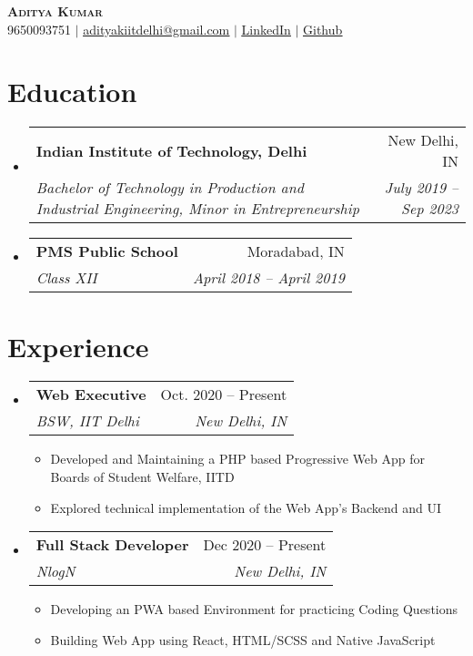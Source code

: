 \documentclass[letterpaper,11pt]{article}
\makeatletter
\newcommand{\resumeItem}[1]{
  \item\small{
    {#1 \vspace{-2pt}}
  }
}
\newcommand{\resumeSubheading}[4]{
  \vspace{-2pt}\item
    \begin{tabular*}{0.97\textwidth}[t]{l@{\extracolsep{\fill}}r}
      \textbf{#1} & #2 \\
      \textit{\small#3} & \textit{\small #4} \\
    \end{tabular*}\vspace{-7pt}
}
\newcommand{\resumeSubHeadingListStart}{\begin{itemize}[leftmargin=0.15in, label={}]}
\newcommand{\resumeSubHeadingListEnd}{\end{itemize}}
\newcommand{\resumeItemListStart}{\begin{itemize}}
\newcommand{\resumeItemListEnd}{\end{itemize}\vspace{-5pt}}
\makeatother
\begin{document}
\begin{center}
    \textbf{\Huge \scshape Aditya Kumar} \\ \vspace{5pt}
    \small 9650093751 $|$ \href{mailto:adityakiitdelhi@gmail.com}{\underline{adityakiitdelhi@gmail.com}} $|$ 
    \href{https://linkedin.com/in/aditya-kumar-inductor}{\underline{LinkedIn}} $|$
    \href{https://github.com/inductor69}{\underline{Github}}
\end{center}


\section{Education}
  \resumeSubHeadingListStart
    \resumeSubheading
      {Indian Institute of Technology, Delhi}{New Delhi, IN}
      {Bachelor of Technology in Production and Industrial Engineering, Minor in Entrepreneurship}{July 2019 -- Sep 2023}
    \resumeSubheading
      {PMS Public School}{Moradabad, IN}
      {Class XII}{April 2018 -- April 2019}
  \resumeSubHeadingListEnd


\section{Experience}
  \resumeSubHeadingListStart

    \resumeSubheading
      {Web Executive}{Oct. 2020 -- Present}
      {BSW, IIT Delhi}{New Delhi, IN}
      \resumeItemListStart
        \resumeItem{Developed and Maintaining a PHP based Progressive Web App for Boards of Student Welfare, IITD}
        \resumeItem{Explored technical implementation of the Web App's Backend and UI}
      \resumeItemListEnd

    \resumeSubheading
      {Full Stack Developer}{Dec 2020 -- Present}
      {NlogN}{New Delhi, IN}
      \resumeItemListStart
        \resumeItem{Developing an PWA based Environment for practicing Coding Questions}
        \resumeItem{Building Web App using React, HTML/SCSS and Native JavaScript}
   
    \resumeItemListEnd

  \resumeSubHeadingListEnd


\end{document}

